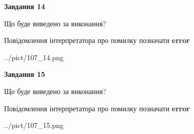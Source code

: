 \documentclass[11pt, ukrainian]{article}
\begin{document}
{\begin {large}
{\begin {center}\textbf{Завдання 14}\end {center}}\par
Що буде виведено за виконання? \par
Повідомлення інтерпретатора про помилку позначати \textbf{error}

\begin{center}
	{../pict/107_14.png}
\end{center}
\newpage

{\begin {center}\textbf{Завдання 15}\end {center}}\par
Що буде виведено за виконання? \par
Повідомлення інтерпретатора про помилку позначати \textbf{error}

\begin{center}
	{../pict/107_15.png}
\end{center}
\newpage

\end {large}}
\end{document}
